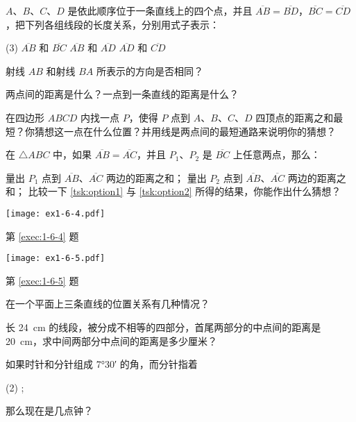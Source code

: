 \begin{Exercise}[复习题]
\begin{question}
	\item $A$、$B$、$C$、$D$ 是依此顺序位于一条直线上的四个点，并且 $\overline{AB}=\overline{BD}$，$\overline{BC}=\overline{CD}$，把下列各组线段的长度关系，分别用式子表示：
	\begin{tasks}(3)
		\task $\overline{AB}$ 和 $\overline{BC}$
		\task $\overline{AB}$ 和 $\overline{AD}$
		\task $\overline{AD}$ 和 $\overline{CD}$
	\end{tasks}
	\item 射线 $AB$ 和射线 $BA$ 所表示的方向是否相同？
	\item 两点间的距离是什么？一点到一条直线的距离是什么？
	\item\label{exec:1-6-4} 在四边形 $ABCD$ 内找一点 $P$，使得 $P$ 点到 $A$、$B$、$C$、$D$ 四顶点的距离之和最短？你猜想这一点在什么位置？并用线是两点间的最短通路来说明你的猜想？
	\item\label{exec:1-6-5} 在 $\triangle ABC$ 中，如果 $\overline{AB}=\overline{AC}$，并且 $P_1$、$P_2$ 是 $\overline{BC}$ 上任意两点，那么：
	\begin{tasks}
		\task\label{tsk:option1} 量出 $P_1$ 点到 $\overline{AB}$、$\overline{AC}$ 两边的距离之和；
		\task\label{tsk:option2} 量出 $P_2$ 点到 $\overline{AB}$、$\overline{AC}$ 两边的距离之和；
		\task 比较一下 \ref{tsk:option1} 与 \ref{tsk:option2} 所得的结果，你能作出什么猜想？
	\end{tasks}
	\begin{figurehere}
		\begin{minipage}[b]{0.48\linewidth}
			\centering
			\texttt{[image: ex1-6-4.pdf]}
			\caption*{第 \ref{exec:1-6-4} 题}
		\end{minipage}
		\begin{minipage}[b]{0.48\linewidth}
			\centering
      \texttt{[image: ex1-6-5.pdf]}
			\caption*{第 \ref{exec:1-6-5} 题}
		\end{minipage}
	\end{figurehere}
	\item 在一个平面上三条直线的位置关系有几种情况？
	\item 长 \qty{24}{cm} 的线段，被分成不相等的四部分，首尾两部分的中点间的距离是 \qty{20}{cm}，求中间两部分中点间的距离是多少厘米？
	\item 如果时针和分针组成 \ang{7;30;} 的角，而分针指着
	\begin{tasks}(2)
		\task 3;
		\task 9
	\end{tasks}
	那么现在是几点钟？

\end{question}
\end{Exercise}
